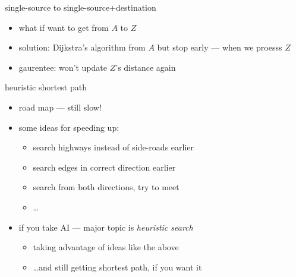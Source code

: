 \begin{frame}{single-source to single-source+destination}
\begin{itemize}
\item what if want to get from $A$ to $Z$
\item solution: Dijkstra's algorithm from $A$ but stop early --- when we proesss $Z$
\item gaurentee: won't update $Z$'s distance again
\end{itemize}
\end{frame}

\begin{frame}{heuristic shortest path}
\begin{itemize}
\item road map --- still slow!
\item some ideas for speeding up:
\begin{itemize}
\item search highways instead of side-roads earlier
\item search edges in correct direction earlier
\item search from both directions, try to meet
\item \ldots
\end{itemize}
\item if you take AI --- major topic is \textit{heuristic search}
    \begin{itemize}
    \item taking advantage of ideas like the above
    \item \ldots and still getting shortest path, if you want it
    \end{itemize}
\end{itemize}
\end{frame}



